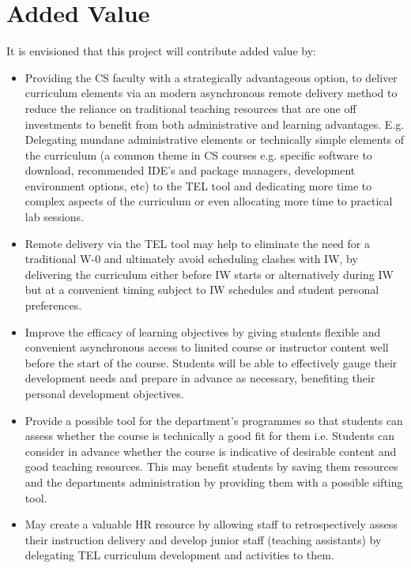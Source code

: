 \section{Added Value}
\label{sec:sec01}

It is envisioned that this project will contribute added value by:
\begin{itemize}
    \item Providing the CS faculty with a strategically advantageous option, to deliver curriculum elements via an modern asynchronous remote delivery method to reduce the reliance on traditional teaching resources that are one off investments to benefit from both administrative and learning advantages. E.g. Delegating mundane administrative elements or technically simple elements of the curriculum (a common theme in CS courses e.g. specific software to download, recommended IDE's and package managers, development environment options, etc) to the TEL tool and dedicating more time to complex aspects of the curriculum or even allocating more time to practical lab sessions.
    
    \item Remote delivery via the TEL tool may help to eliminate the need for a traditional W-0 and ultimately avoid scheduling clashes with IW, by delivering the curriculum either before IW starts or alternatively during IW but at a  convenient timing subject to IW schedules and student personal preferences.
    
    \item Improve the efficacy of learning objectives by giving students flexible and convenient asynchronous access to limited course or instructor content well before the start of the course. Students will be able to effectively gauge their development needs and prepare in advance as necessary, benefiting their personal development objectives.
    
    \item Provide a possible  tool for the department's programmes so that students can assess whether the course is technically a good fit for them i.e. Students can consider in advance whether the course is indicative of desirable content and good teaching resources. This may benefit students by saving them resources and the departments administration by providing them with a possible sifting tool.
    
    \item May create a valuable HR resource by allowing staff to retrospectively assess their instruction delivery and develop junior staff (teaching assistants) by delegating TEL curriculum development and activities to them.
    

\end{itemize}
